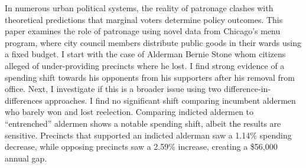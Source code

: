 \begin{spacing}{1.0}
    In numerous urban political systems, the reality of patronage clashes with theoretical predictions that marginal voters determine policy outcomes. This paper examines the role of patronage
    using novel data from Chicago’s menu program, where city council members distribute public
    goods in their wards using a fixed budget. 
    I start with the case of Alderman Bernie Stone whom citizens alleged of under-providing precincts where he lost. 
    I find strong evidence of a spending shift towards his opponents from his supporters after his removal from office. 
    Next, I investigate if this is a broader issue using two difference-in-differences approaches. 
    I find no significant shift comparing incumbent aldermen who barely won and lost reelection. 
    Comparing indicted aldermen to “entrenched” aldermen shows a notable spending shift, albeit the results are sensitive.
    Precincts that supported an indicted alderman saw a 1.14\% spending decrease, while opposing precincts saw a 2.59\% increase, creating a \$56,000 annual gap.
\end{spacing}